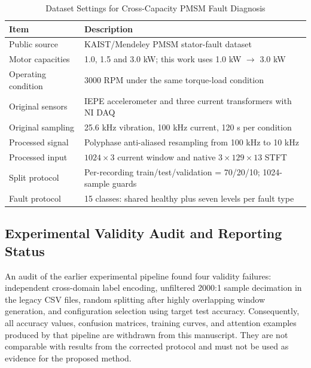 \documentclass[conference,letterpaper]{IEEEtran}\IEEEoverridecommandlockouts
\begin{document}
\begin{table}[!t]
\caption{Dataset Settings for Cross-Capacity PMSM Fault Diagnosis}
\label{tab:dataset}
\centering
\footnotesize
\begin{tabular}{L{2.35cm} L{5.0cm}}
\toprule
Item & Description \\
\midrule
Public source & KAIST/Mendeley PMSM stator-fault dataset \\
Motor capacities & 1.0, 1.5 and 3.0 kW; this work uses 1.0 kW $\rightarrow$ 3.0 kW \\
Operating condition & 3000 RPM under the same torque-load condition \\
Original sensors & IEPE accelerometer and three current transformers with NI DAQ \\
Original sampling & 25.6 kHz vibration, 100 kHz current, 120 s per condition \\
Processed signal & Polyphase anti-aliased resampling from 100 kHz to 10 kHz \\
Processed input & $1024\times3$ current window and native $3\times129\times13$ STFT \\
Split protocol & Per-recording train/test/validation = 70/20/10; 1024-sample guards \\
Fault protocol & 15 classes: shared healthy plus seven levels per fault type \\
\bottomrule
\end{tabular}
\end{table}

\subsection{Experimental Validity Audit and Reporting Status}
An audit of the earlier experimental pipeline found four validity failures: independent cross-domain label encoding, unfiltered 2000:1 sample decimation in the legacy CSV files, random splitting after highly overlapping window generation, and configuration selection using target test accuracy. Consequently, all accuracy values, confusion matrices, training curves, and attention examples produced by that pipeline are withdrawn from this manuscript. They are not comparable with results from the corrected protocol and must not be used as evidence for the proposed method.
\end{document}
